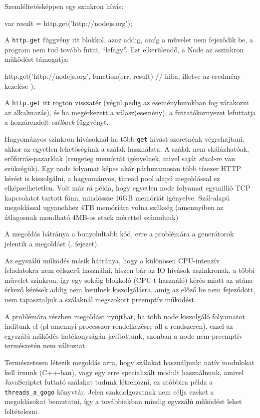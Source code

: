 Szemléltetésképpen egy szinkron hívás:

\begin{js}
var result = http.get('http://nodejs.org');
\end{js}

A \verb=http.get= függvény itt blokkol, azaz addig, amíg a művelet nem
fejeződik be, a program nem tud tovább futni, ``lefagy''.
Ezt elkerülendő, a Node az aszinkron működést támogatja:

\begin{js}
http.get('http://nodejs.org', function(err, result) {
  // hiba, illetve az eredmény kezelése
});
\end{js}

A \verb=http.get= itt rögtön visszatér (végül pedig az eseményhurokban fog
várakozni az alkalmazás), és ha megérkezett a válasz(esemény),
a futtatókörnyezet lefuttatja a hozzárendelt \emph{callback} függvényt.

Hagyományos szinkron hívásoknál ha több \verb=get= hívást szeretnénk
végrehajtani, akkor az egyetlen lehetőségünk a szálak használata.
A szálak nem skálázhatóak, erőforrás-pazarlóak (rengeteg memóriát igényelnek,
mivel saját \emph{stack}-re van szükségük).
Egy node folyamat képes akár párhuzamosan több tízezer HTTP kérést
is kiszolgálni, a hagyományos, thread pool alapú megoldással ez
elképzelhetetlen.
Volt már rá példa, hogy egyetlen node folyamat egymillió TCP kapcsolatot
tartott fönn\cite{Node-1M}, mindössze 16GB memóriát igényelve.
Szál-alapú megoldással ugyanehhez 4TB memóriára volna szükség (amennyiben
az átlagosnak mondható 4MB-os stack mérettel számolunk)

A megoldás hátránya a bonyolultabb kód, erre a problémára a generátorok
jelentik a megoldást (. fejezet).

Az egyszálú működés másik hátránya, hogy a különösen CPU-intenzív feladatokra
nem célszerű használni, hiszen bár az IO hívások aszinkronak, a többi
művelet szinkron, így egy sokáig blokkoló (CPU-t használó) kérés miatt az
utána érkező kérések addig nem kerülnek kiszolgálásra, amíg az előző be nem
fejeződött, nem tapasztaljuk a szálaknál megszokott preemptív működést.

A problémára részben megoldást nyújthat, ha több node kiszolgáló folyamatot
indítunk el (pl amennyi processzor rendelkezésre áll a rendszeren), ezzel
az egyszálú működés hatékonyságán javítottunk, azonban a node nem-preemptív
természetén nem változtat.

Természetesen létezik megoldás arra, hogy szálakat használjunk: natív modulokat
kell írnunk (C++-ban), vagy egy erre specializált modult használnunk,
amivel JavaScriptet futtató szálakat tudunk létrehozni, ez utóbbira példa
a \verb=threads_a_gogo= könyvtár.\cite{Threads-a-gogo}
Jelen szakdolgozatnak nem célja ezeket a
megoldásokat bemutatni, így a továbbiakban mindig egyszálú működést lehet
feltételezni.

